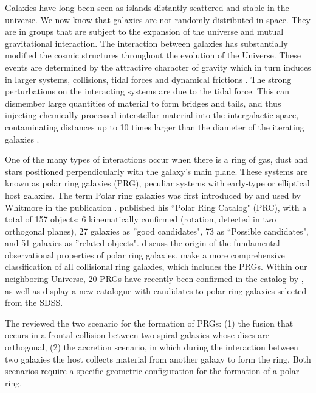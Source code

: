 \documentclass[useAMS,usenatbib]{mn2e}
\begin{document}
Galaxies have long been seen as islands distantly scattered and stable in the
universe. We now know that galaxies are not randomly distributed in
space. They are in groups that are subject to the expansion of the universe
and mutual gravitational interaction. The interaction between galaxies has
substantially modified the cosmic structures throughout the evolution of the
Universe. These events are determined by the attractive character of
gravity which in turn induces in larger systems, collisions, tidal forces
and dynamical frictions \citep{1999AJ....117.2695R}. The strong perturbations on
the interacting systems are due to the tidal
force. This can dismember large quantities of material to form bridges
and tails, and thus injecting chemically processed interstellar material into
the 
intergalactic space, contaminating distances up to 10 times larger
than the diameter of the iterating galaxies \citep{1997ASPC..114...71D}.

One of the many types of interactions occur when there
is a ring of gas, dust and stars positioned perpendicularly
with the galaxy's main plane. These systems are known as
polar ring galaxies (PRG), peculiar systems with early-type
or elliptical host galaxies.  The term Polar ring galaxies was first introduced by \cite{1983AJ.....88..909S} and used by Whitmore in the publication \cite{1987ApJ...314..439W}.
\cite{1990AJ....100.1489W} published his ``Polar Ring Catalog" (PRC), with a
total of 157 objects: 6 kinematically confirmed (rotation, detected in two
orthogonal planes), 27 galaxies as ''good candidates", 73 as ``Possible
candidates", and 51 galaxies as ''related objects". \cite{1998ApJ...499..635B} discuss
the origin of the fundamental observational properties of polar ring
galaxies. \cite{1998A&AS..129..357F} make a more
comprehensive classification of all collisional ring galaxies, which
includes the PRGs. Within our neighboring Universe, 20 PRGs have recently
been confirmed in the catalog by \cite{2009Natur.461...43G},  as well as \cite{2011MNRAS.418..244M} display a new catalogue with candidates to polar-ring galaxies selected from the SDSS. 

The \cite{2003A&A...401..817B} reviewed the two scenario for the formation of PRGs: (1) the fusion that occurs in a frontal collision between two spiral galaxies whose discs are orthogonal, (2) the accretion
scenario, in which during the interaction between two galaxies the host collects
material from another galaxy to form the ring. Both scenarios require a
specific geometric configuration for the formation of a polar ring. 
\end{document}
